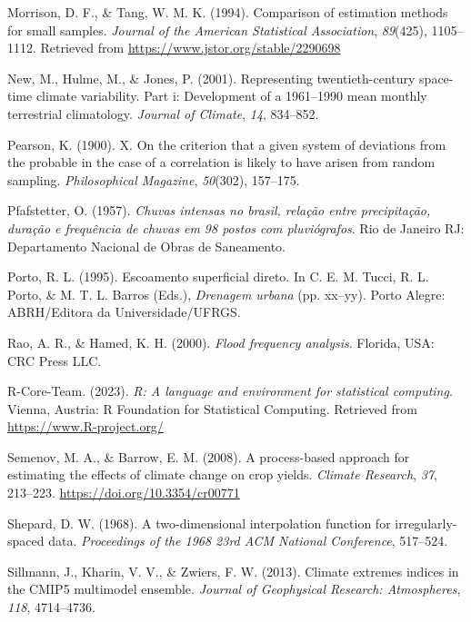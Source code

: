 \documentclass[
]{agujournal2019}
\newlength{\cslhangindent}
\newenvironment{CSLReferences}[2] %
 {\begin{list}{}{%
  \setlength{\itemindent}{0pt}
  \setlength{\leftmargin}{0pt}
  \setlength{\parsep}{0pt}
  \ifodd #1
   \setlength{\leftmargin}{\cslhangindent}
   \setlength{\itemindent}{-1\cslhangindent}
  \fi
  \setlength{\itemsep}{#2\baselineskip}}}
 {\end{list}}
\begin{document}
\begin{CSLReferences}{1}{0}
Morrison, D. F., \& Tang, W. M. K. (1994). Comparison of estimation
methods for small samples. \emph{Journal of the American Statistical
Association}, \emph{89}(425), 1105--1112. Retrieved from
\url{https://www.jstor.org/stable/2290698}

New, M., Hulme, M., \& Jones, P. (2001). Representing twentieth-century
space-time climate variability. Part i: Development of a 1961--1990 mean
monthly terrestrial climatology. \emph{Journal of Climate}, \emph{14},
834--852.

Pearson, K. (1900). X. On the criterion that a given system of
deviations from the probable in the case of a correlation is likely to
have arisen from random sampling. \emph{Philosophical Magazine},
\emph{50}(302), 157--175.

Pfafstetter, O. (1957). \emph{Chuvas intensas no brasil, relação entre
precipitação, duração e frequência de chuvas em 98 postos com
pluviógrafos}. Rio de Janeiro RJ: Departamento Nacional de Obras de
Saneamento.

Porto, R. L. (1995). Escoamento superficial direto. In C. E. M. Tucci,
R. L. Porto, \& M. T. L. Barros (Eds.), \emph{Drenagem urbana} (pp.
xx--yy). Porto Alegre: ABRH/Editora da Universidade/UFRGS.

Rao, A. R., \& Hamed, K. H. (2000). \emph{Flood frequency analysis}.
Florida, USA: CRC Press LLC.

R-Core-Team. (2023). \emph{R: A language and environment for statistical
computing}. Vienna, Austria: R Foundation for Statistical Computing.
Retrieved from \url{https://www.R-project.org/}

Semenov, M. A., \& Barrow, E. M. (2008). A process-based approach for
estimating the effects of climate change on crop yields. \emph{Climate
Research}, \emph{37}, 213--223. \url{https://doi.org/10.3354/cr00771}

Shepard, D. W. (1968). A two-dimensional interpolation function for
irregularly-spaced data. \emph{Proceedings of the 1968 23rd ACM National
Conference}, 517--524.

Sillmann, J., Kharin, V. V., \& Zwiers, F. W. (2013). Climate extremes
indices in the CMIP5 multimodel ensemble. \emph{Journal of Geophysical
Research: Atmospheres}, \emph{118}, 4714--4736.


\end{CSLReferences}
\end{document}
